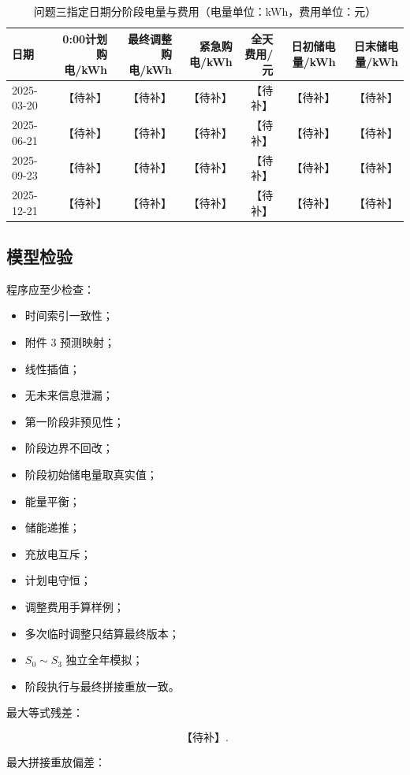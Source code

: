 \begin{table}[H]
\centering
{}
\begin{tabular}{lrrrrrr}
\toprule
日期 & 0:00计划购电/kWh & 最终调整购电/kWh & 紧急购电/kWh & 全天费用/元 & 日初储电量/kWh & 日末储电量/kWh \\
\midrule
2025-03-20 & 【待补】 & 【待补】 & 【待补】 & 【待补】 & 【待补】 & 【待补】 \\
2025-06-21 & 【待补】 & 【待补】 & 【待补】 & 【待补】 & 【待补】 & 【待补】 \\
2025-09-23 & 【待补】 & 【待补】 & 【待补】 & 【待补】 & 【待补】 & 【待补】 \\
2025-12-21 & 【待补】 & 【待补】 & 【待补】 & 【待补】 & 【待补】 & 【待补】 \\
\bottomrule
\end{tabular}
\caption{问题三指定日期分阶段电量与费用（电量单位：kWh，费用单位：元）}
\label{tab:9}
\end{table}

\subsection{模型检验}

程序应至少检查：

\begin{itemize}
\item 时间索引一致性；
\item 附件 3 预测映射；
\item 线性插值；
\item 无未来信息泄漏；
\item 第一阶段非预见性；
\item 阶段边界不回改；
\item 阶段初始储电量取真实值；
\item 能量平衡；
\item 储能递推；
\item 充放电互斥；
\item 计划电守恒；
\item 调整费用手算样例；
\item 多次临时调整只结算最终版本；
\item \(S_0\sim S_3\) 独立全年模拟；
\item 阶段执行与最终拼接重放一致。
\end{itemize}

最大等式残差：

\[
\text{【待补】}.
\]

最大拼接重放偏差：

